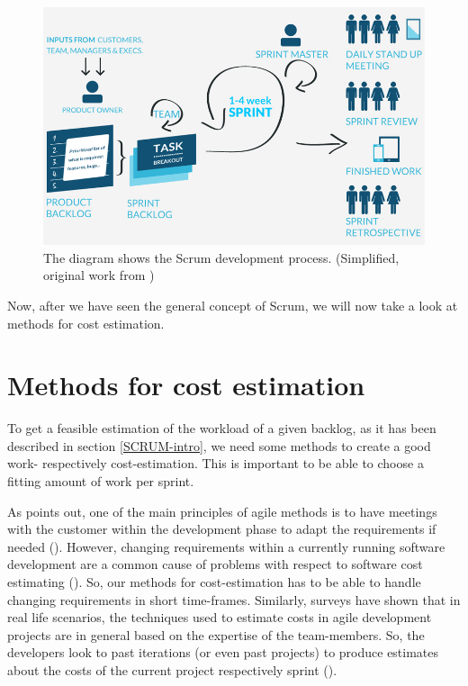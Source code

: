 \begin{figure}[th]
\centerline{\includegraphics[width=1\textwidth]{gfx/scrum}}
\caption{The diagram shows the Scrum development process. (Simplified, original work from \cite{5_maxxor.com_2015})}
\label{ScrumDia}
\end{figure}

Now, after we have seen the general concept of Scrum, we will now take a look at methods for cost estimation. 

\section{Methods for cost estimation}
\label{cost}
To get a feasible estimation of the workload of a given backlog, as it has been described in section \ref{SCRUM-intro}, we need some methods to create a good work- respectively cost-estimation. This is important to be able to choose a fitting amount of work per sprint.

As \cite{Keaveney11} points out, one of the main principles of agile methods is to have meetings with the customer within the development phase to adapt the requirements if needed (\cite{beck2001}). However, changing requirements within a currently running software development are a common cause of problems with respect to software cost estimating (\cite{jones2003flawed}). So, our methods for cost-estimation has to be able to handle changing requirements in short time-frames. Similarly, surveys have shown that in real life scenarios, the techniques used to estimate costs in agile development projects are in general based on the expertise of the team-members. So, the developers look to past iterations (or even past projects) to produce estimates about the costs of the current project respectively sprint (\cite{ceschi2005project}). 

